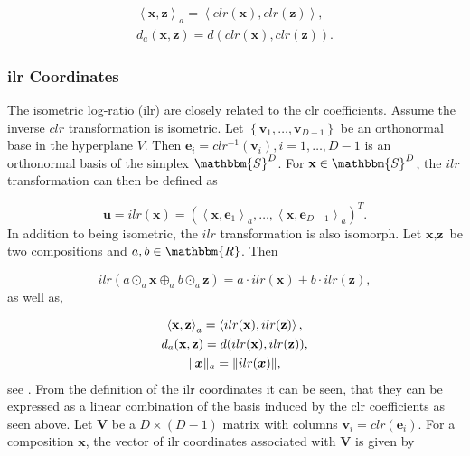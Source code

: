 \begin{gather}
\left\langle  \textbf{x},\textbf{z} \right\rangle_a = \left\langle  clr(\textbf{x}),clr(\textbf{z}) \right\rangle, \\
d_a(\textbf{x},\textbf{z}) = d(clr(\textbf{x}),clr(\textbf{z})).
\label{eq:clr Coefficients isometric}
\end{gather}

\subsubsection{ilr Coordinates}
\label{sec:ilr Coordinates}

The isometric log-ratio (ilr) are closely related to the clr coefficients. Assume the inverse $clr$ transformation is isometric. Let $\left\{\bm{v}_1,\ldots,\bm{v}_{D-1}\right\}$ be an orthonormal base in the hyperplane $V$. Then $\textbf{e}_i = clr^{-1}(\bm{v}_i), i=1,\ldots,D-1$ is an orthonormal basis of the simplex $\mathbbm{S}^D$. For $\textbf{x} \in \mathbbm{S}^D$, the $ilr$ transformation can then be defined as 

\begin{equation}
\textbf{u} = ilr(\textbf{x}) = \left(\left\langle \textbf{x},\textbf{e}_1\right\rangle_a,\ldots,\left\langle \textbf{x},\textbf{e}_{D-1}\right\rangle_a\right)^T.
\label{eq:ilr Coordinates}
\end{equation}
%
In addition to being isometric, the $ilr$ transformation is also isomorph. Let $\textbf{x}, \textbf{z}$ be two compositions and $a, b  \in \mathbbm{R}$. Then

\begin{equation}
ilr(a \odot_a \textbf{x} \oplus_a b \odot_a \textbf{z}) = a \cdot ilr(\textbf{x}) + b \cdot ilr(\textbf{z}),
\label{eq:ilr coordinates isomorph}
\end{equation}
as well as,

\begin{gather}
\left\langle  \textbf{x},\textbf{z} \right\rangle_a = \left\langle  ilr(\textbf{x}), ilr(\textbf{z}) \right\rangle, \\
d_a(\textbf{x},\textbf{z}) = d(ilr(\textbf{x}),ilr(\textbf{z})),\\
\lVert\bm{x}\rVert_a = \lVert ilr(\bm{x})\rVert,
\label{eq:ilr coordinates isometric }
\end{gather}
%
see \textcite{Kynclova:2015}. From the definition of the ilr coordinates it can be seen, that they can be expressed as a linear combination of the basis induced by the clr coefficients as seen above. Let $\textbf{V}$ be a $D \times (D-1)$ matrix with columns $\textbf{v}_i = clr(\textbf{e}_i)$. For a composition $\textbf{x}$, the vector of ilr coordinates associated with $\textbf{V}$ is given by

